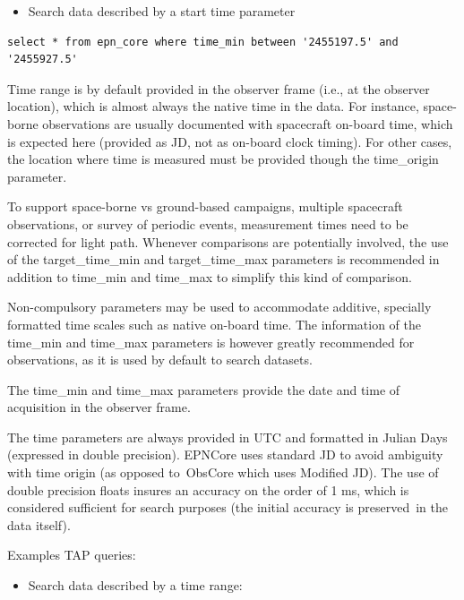 \documentclass[11pt,a4paper]{ivoa}
\begin{document}
\begin{itemize}
\item Search data described by a start time parameter
\end{itemize}






\begin{verbatim}
select * from epn_core where time_min between '2455197.5' and '2455927.5'
\end{verbatim}




Time range is by default provided in the observer frame (i.e., at the observer location), which is almost always the native time in the data. For instance, space-borne observations are usually documented with spacecraft on-board time, which is expected here (provided as JD, not as on-board clock timing). For other cases, the location where time is measured must be provided though the time\_origin parameter.

To support space-borne vs ground-based campaigns, multiple spacecraft observations, or survey of periodic events, measurement times need to be corrected for light path. Whenever comparisons are potentially involved, the use of the target\_time\_min and target\_time\_max parameters is recommended in addition to time\_min and time\_max to simplify this kind of comparison.

Non-compulsory parameters may be used to accommodate additive, specially formatted time scales such as native on-board time. The information of the time\_min and time\_max parameters is however greatly recommended for observations, as it is used by default to search datasets.

The time\_min and time\_max parameters provide the date and time of acquisition in the observer frame. 

The time parameters are always provided in UTC and formatted in Julian Days (expressed in double precision). EPNCore uses standard JD to avoid ambiguity with time origin (as opposed to ObsCore which uses Modified JD). The use of double precision floats insures an accuracy on the order of 1 ms, which is considered sufficient for search purposes (the initial accuracy is preserved in the data itself).

Examples TAP queries:

\begin{itemize}
\item Search data described by a time range:
\end{itemize}
\end{document}
